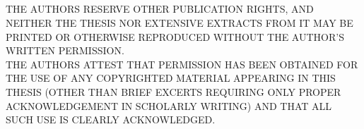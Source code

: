 

\subsection*{}
\small{THE AUTHORS RESERVE OTHER PUBLICATION RIGHTS, AND NEITHER THE THESIS NOR EXTENSIVE EXTRACTS FROM IT MAY BE PRINTED OR OTHERWISE REPRODUCED WITHOUT THE AUTHOR’S WRITTEN PERMISSION.\\
THE AUTHORS ATTEST THAT PERMISSION HAS BEEN OBTAINED FOR THE USE OF ANY COPYRIGHTED MATERIAL APPEARING IN THIS THESIS (OTHER THAN BRIEF EXCERTS REQUIRING ONLY PROPER ACKNOWLEDGEMENT IN SCHOLARLY WRITING) AND THAT ALL SUCH USE IS CLEARLY ACKNOWLEDGED.}

